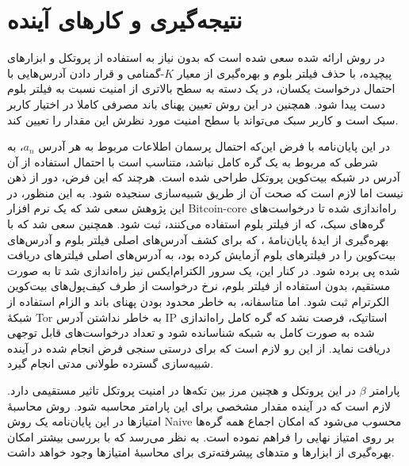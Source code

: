 \chapter{
	نتیجه‌گیری و کار‌های آینده}
\label{chap:future}

در روش ارائه شده سعی شده است که بدون نیاز به استفاده از پروتکل و ابزار‌های پیچیده، با حذف فیلتر بلوم و بهره‌گیری از معیار ‌$K$-گمنامی و قرار دادن آدرس‌هایی با احتمال درخواست یکسان، در یک دسته به سطح بالاتری از امنیت نسبت به فیلتر بلوم دست پیدا شود. همچنین در این روش تعیین پهنای باند مصرفی کاملا در اختیار کاربر سبک است و کاربر سبک می‌تواند با سطح امنیت مورد نظرش این مقدار را تعیین کند.

در این پایان‌نامه با فرض این‌که احتمال پرسمان اطلاعات مربوط به هر آدرس $a_n$، به شرطی که مربوط به یک گره کامل نباشد، متناسب است با احتمال استفاده از آن آدرس در شبکه بیت‌کوین پروتکل طراحی شده است. هرچند که این فرض،‌ دور از ذهن نیست اما لازم است که صحت آن از طریق شبیه‌سازی سنجیده شود. به این منظور، در این  پژوهش سعی شد که یک نرم افزار 
\gls{Bitcoin-core}
راه‌اندازی شده تا درخواست‌های گره‌های سبک، که از فیلتر بلوم استفاده می‌کنند، ثبت شود. همچنین سعی شد که با بهره‌گیری از ایدهٔ پایان‌نامهٔ \cite{Nick2015}، که برای کشف آدرس‌های اصلی فیلتر بلوم  و  آدرس‌های بیت‌کوین را در فیلتر‌های بلوم آزمایش کرده بود، به آدرس‌های اصلی فیلترهای دریافت شده پی برده شود. در کنار این، یک سرور
الکترام‌ایکس
نیز راه‌اندازی شد تا به صورت مستقیم، بدون استفاده از فیلتر بلوم، نرخ درخواست از طرف کیف‌پول‌های بیت‌کوین الکرترام ثبت شود. اما متاسفانه، به خاطر محدود بودن پهنای باند و الزام استفاده از شبکهٔ 
\gls{Tor}
به خاطر نداشتن آدرس IP استاتیک، فرصت نشد که گره‌ کامل راه‌اندازی شده به صورت کامل به شبکه شناسانده شود و تعداد درخواست‌های قابل توجهی دریافت نماید. از این رو لازم است که برای درستی سنجی فرض انجام شده در آینده شبیه‌سازی‌ گسترده طولانی مدتی انجام گیرد. 

پارامتر $\beta$ در این پروتکل و هچنین مرز بین تکه‌ها در امنیت پروتکل تاثیر مستقیمی دارد. لازم است که در آینده مقدار مشخصی برای این پارامتر محاسبه شود. روش محاسبهٔ امتیازها در این پایان‌نامه یک روش 
\gls{Naive} 
محسوب می‌شود که امکان اجماع همه گره‌ها بر روی امتیاز نهایی را فراهم نموده است. به نظر می‌رسد که با بررسی بیشتر امکان بهره‌گیری از ابزار‌ها و متدهای پیشرفته‌تری برای محاسبهٔ امتیا‌ز‌ها وجود خواهد داشت.

